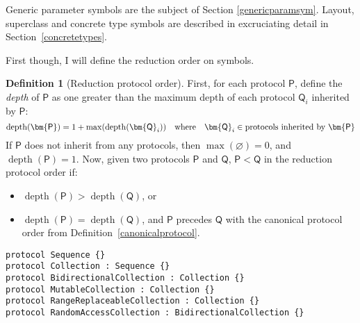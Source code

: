 \documentclass[a4paper,headsepline,bibliography=totoc,toc=flat,fleqn,twoside=semi]{scrbook}
\theoremstyle{definition}
\newtheorem{definition}{Definition}[chapter]
\theoremstyle{definition}
\theoremstyle{definition}
\newcommand{\proto}[1]{\bm{\mathsf{#1}}}
\DeclareMathOperator{\gpdepth}{depth}
\begin{document}
Generic parameter symbols are the subject of Section \ref{genericparamsym}. Layout, superclass and concrete type symbols are described in excruciating detail in Section~\ref{concretetypes}.

First though, I will define the reduction order on symbols.

\begin{definition}[Reduction protocol order]\label{protocolorder} First, for each protocol $\proto{P}$, define the \emph{depth} of $\proto{P}$ as one greater than the maximum depth of each protocol $\proto{Q}_i$ inherited by $\proto{P}$:
\[\gpdepth(\proto{P}) = 1 + \max(\gpdepth(\proto{Q}_i))\quad\hbox{where}\quad \bm{\mathsf{Q}}_i \in \hbox{protocols inherited by $\proto{P}$}\]
If $\proto{P}$ does not inherit from any protocols, then $\max(\varnothing)=0$, and $\gpdepth(\proto{P})=1$. Now, given two protocols $\proto{P}$ and $\proto{Q}$, $\proto{P}<\proto{Q}$ in the reduction protocol order if:

\begin{itemize}
\item $\gpdepth(\proto{P}) > \gpdepth(\proto{Q})$, or
\item $\gpdepth(\proto{P}) = \gpdepth(\proto{Q})$, and $\proto{P}$ precedes $\proto{Q}$ with the canonical protocol order from Definition~\ref{canonicalprotocol}.
\end{itemize}
\end{definition}
\begin{listing}\label{collectiontower}
\begin{Verbatim}
protocol Sequence {}
protocol Collection : Sequence {}
protocol BidirectionalCollection : Collection {}
protocol MutableCollection : Collection {}
protocol RangeReplaceableCollection : Collection {}
protocol RandomAccessCollection : BidirectionalCollection {}
\end{Verbatim}
\end{listing}
\end{document}
